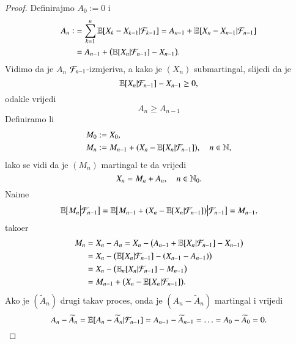 \begin{proof}
    Definirajmo $A_0 := 0$ i
    \begin{equation*}
        \begin{aligned}
            A_n :&= \sum\limits_{k = 1}^{n} \mathbb{E} [X_k - X_{k - 1} | \mathcal{F}_{k - 1}] = A_{n - 1} + \mathbb{E} [X_n - X_{n - 1} | \mathcal{F}_{n - 1}]\\
            &= A_{n - 1} + \big(\mathbb{E} [X_n | \mathcal{F}_{n - 1}] - X_{n - 1} \big).
        \end{aligned}
    \end{equation*}
    Vidimo da je $A_n$ $\mathcal{F}_{n - 1}$-izmjeriva, a kako je $(X_n)$ submartingal, slijedi da je
    \begin{equation*}
        \mathbb{E} [X_n | \mathcal{F}_{n - 1}] - X_{n - 1} \geq 0,
    \end{equation*}
    odakle vrijedi
    \begin{equation*}
        A_n \geq A_{n - 1}
    \end{equation*}
    Definiramo li
    \begin{equation*}
        \begin{aligned}
            M_0 &:= X_0,\\
            M_n &:= M_{n - 1} + (X_n - \mathbb{E} [X_n | \mathcal{F}_{n - 1}]), \quad n \in \mathbb{N},
        \end{aligned}
    \end{equation*}
    lako se vidi da je $(M_n)$ martingal te da vrijedi
    \begin{equation*}
        X_n = M_n + A_n, \quad n \in \mathbb{N}_0.
    \end{equation*}
    Naime
    \begin{equation*}
        \mathbb{E} \big[ M_n \big| \mathcal{F}_{n - 1} \big] = \mathbb{E} \big[ M_{n - 1} + (X_n - \mathbb{E} [X_n | \mathcal{F}_{n - 1}]) \big| \mathcal{F}_{n - 1} \big] = M_{n - 1},
    \end{equation*}
    tako\dj er
    \begin{equation*}
        \begin{aligned}
            M_n &= X_n - A_n = X_n - \big( A_{n - 1} + \mathbb{E} [X_n | \mathcal{F}_{n - 1}] - X_{n - 1} \big)\\
            &= X_n - \big( \mathbb{E} [X_n | \mathcal{F}_{n - 1}] - (X_{n - 1} - A_{n - 1}) \big)\\
            &= X_n - \big( \mathbb{E}_n [X_n | \mathcal{F}_{n - 1}] - M_{n - 1} \big)\\
            &= M_{n - 1} + \big( X_n - \mathbb{E} [X_n | \mathcal{F}_{n - 1}] \big).
        \end{aligned}
    \end{equation*}
    Ako je $(\widetilde{A}_n)$ drugi takav proces, onda je $(A_n - \widetilde{A}_n)$ martingal i vrijedi
    \begin{equation*}
        A_n - \widetilde{A}_n = \mathbb{E} [A_n - \widetilde{A}_n | \mathcal{F}_{n - 1}] = A_{n - 1} - \widetilde{A}_{n - 1} = \ldots = A_0 - \widetilde{A}_0 = 0.
    \end{equation*}
\end{proof}


